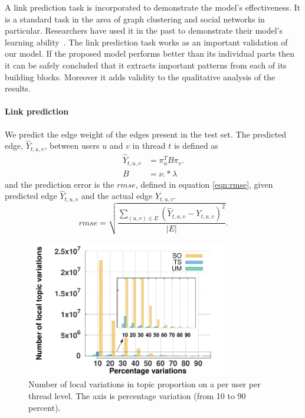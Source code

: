 \documentclass{sig-alternate}
\begin{document}
A link prediction task is incorporated to demonstrate the model's effectiveness.
It is a standard task in the area of graph clustering and social networks in
particular. Researchers have
used it in the past to demonstrate their model's learning 
ability~\cite{Nallapati:2008:JLT:1401890.1401957}.   
The link prediction task works as an important validation of our model. If the
proposed model performs better than its individual parts then it can be safely
concluded that it extracts important patterns from each of its building
blocks. Moreover it adds validity to the qualitative analysis of the results. 

\vspace*{-0.5\baselineskip}
\paragraph{Link prediction} 
  
 We predict the edge weight of the edges
present in the test set. The predicted edge, $\hat{Y}_{t,u,v}$, between users $u$ and
$v$ in thread $t$ is  defined as 
\vspace*{-1\baselineskip}
\small
\begin{align}
	\hat{Y}_{t,u,v} &= \pi^T_uB\pi_v\label{eqn:prediction}.\\
				B&=\nu.*\lambda\label{eqn:blockMat}
\end{align}
\normalsize
and the prediction error is the $rmse$, defined in equation
\ref{eqn:rmse}, given predicted edge
$\hat{Y}_{t,u,v}$ and the actual edge $Y_{t,u,v}$.
\vspace*{-0.5\baselineskip}
\small
\begin{equation}
	rmse=\sqrt{\frac{\sum_{(u,v)\in E}(\hat{Y}_{t,u,v}-Y_{t,u,v})^2}{|E|}}.
	\label{eqn:rmse}
\end{equation}
\normalsize

\begin{figure}
\begin{center}
\includegraphics[height=6cm,width=9cm]{figs/topic_variations.pdf}
\end{center}
\vspace*{-2\baselineskip}
\caption{\small{Number of local variations in topic proportion on a per user per thread
level. The axis is percentage variation (from 10 to 90 percent).}}
\label{fig:localTopicVariations}
\vspace*{-1.5\baselineskip}
\end{figure}
\end{document}
